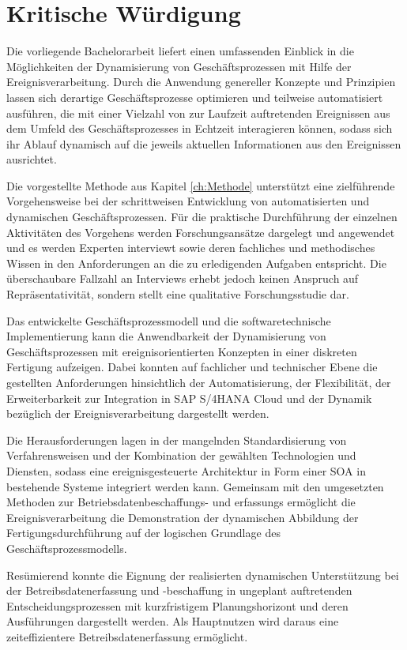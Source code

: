\section{Kritische Würdigung}\label{sec:Kritik}
Die vorliegende Bachelorarbeit liefert einen umfassenden Einblick in die Möglichkeiten der Dynamisierung von Geschäftsprozessen mit Hilfe der Ereignisverarbeitung. 
Durch die Anwendung genereller Konzepte und Prinzipien lassen sich derartige Geschäftsprozesse optimieren und teilweise automatisiert ausführen, die mit einer Vielzahl von zur Laufzeit auftretenden Ereignissen aus dem Umfeld des Geschäftsprozesses in Echtzeit interagieren können, sodass sich ihr Ablauf dynamisch auf die jeweils aktuellen Informationen aus den Ereignissen ausrichtet. 

Die vorgestellte Methode aus Kapitel \ref{ch:Methode} unterstützt eine zielführende Vorgehensweise bei der schrittweisen Entwicklung von automatisierten und dynamischen Geschäftsprozessen. Für die praktische Durchführung der einzelnen Aktivitäten des Vorgehens werden Forschungsansätze dargelegt und angewendet und es werden Experten interviewt sowie deren fachliches und methodisches Wissen in den Anforderungen an die zu erledigenden Aufgaben entspricht.
Die überschaubare Fallzahl an Interviews erhebt jedoch keinen Anspruch auf Repräsentativität, sondern stellt eine qualitative Forschungsstudie dar. 

Das entwickelte Geschäftsprozessmodell und die softwaretechnische Implementierung kann die Anwendbarkeit der Dynamisierung von Geschäftsprozessen mit ereignisorientierten Konzepten in einer diskreten Fertigung aufzeigen. Dabei konnten auf fachlicher und technischer Ebene die gestellten Anforderungen hinsichtlich der Automatisierung, der Flexibilität, der Erweiterbarkeit zur Integration in SAP S/4HANA Cloud und der Dynamik bezüglich der Ereignisverarbeitung dargestellt werden. 

Die Herausforderungen lagen in der mangelnden Standardisierung von Verfahrensweisen und der Kombination der gewählten Technologien und Diensten, sodass eine ereignisgesteuerte Architektur in Form einer \ac{SOA} in bestehende Systeme integriert werden kann. 
Gemeinsam mit den umgesetzten Methoden zur Betriebsdatenbeschaffungs- und erfassungs ermöglicht die Ereignisverarbeitung die Demonstration der dynamischen Abbildung der Fertigungsdurchführung auf der logischen Grundlage des Geschäftsprozessmodells.

Resümierend konnte die Eignung der realisierten dynamischen Unterstützung bei der Betreibsdatenerfassung und -beschaffung in ungeplant auftretenden Entscheidungsprozessen mit kurzfristigem Planungshorizont und deren Ausführungen dargestellt werden. Als Hauptnutzen wird daraus eine zeiteffizientere Betreibsdatenerfassung ermöglicht.